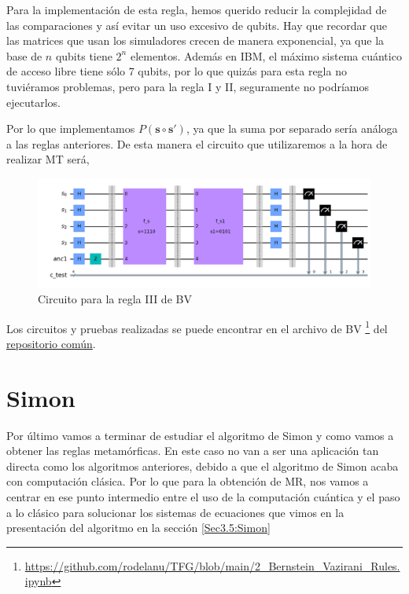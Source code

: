  \vspace{50pt} 

 Para la implementación de esta regla, hemos querido reducir la complejidad de las comparaciones y así evitar un uso excesivo de qubits. Hay que recordar que las matrices que usan los simuladores crecen de manera exponencial, ya que la base de $n$ qubits tiene $2^{n}$ elementos. Además en IBM, el máximo sistema cuántico de acceso libre tiene sólo 7 qubits, por lo que quizás para esta regla no tuviéramos problemas, pero para la regla I y II, seguramente no podríamos ejecutarlos.\newline

 Por lo que implementamos $P(\mathbf{s} \circ \mathbf{s}')$, ya que la suma por separado sería análoga a las reglas anteriores. De esta manera el circuito que utilizaremos a la hora de realizar MT será, \newline

 \begin{figure}[H]
    \centering
    \includegraphics[width=\textwidth]{TFG/imagenes/BVRegla3.png}
    \caption{Circuito para la regla III de BV}
    \label{Fig:CircuitoBVReglaIII}
 \end{figure}

 Los circuitos y pruebas realizadas se puede encontrar en el archivo de BV \footnote{\url{https://github.com/rodelanu/TFG/blob/main/2_Bernstein_Vazirani_Rules.ipynb}} del \href{https://github.com/rodelanu/TFG}{repositorio común}.

 
\section{Simon}
\label{Sec4.3:Simon}

Por último vamos a terminar de estudiar el algoritmo de Simon y como vamos a obtener las reglas metamórficas. En este caso no van a ser una aplicación tan directa como los algoritmos anteriores, debido a que el algoritmo de Simon acaba con computación clásica. Por lo que para la obtención de MR, nos vamos a centrar en ese punto intermedio entre el uso de la computación cuántica y el paso a lo clásico para solucionar los sistemas de ecuaciones que vimos en la presentación del algoritmo en la sección \ref{Sec3.5:Simon} \newline

